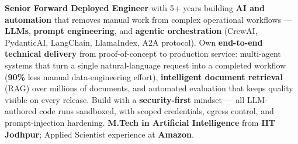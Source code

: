 \documentclass[letter,10pt]{article}
\begin{document}

\textbf{Senior Forward Deployed Engineer} with 5+ years building \textbf{AI and automation} that removes manual work from complex operational workflows --- \textbf{LLMs}, \textbf{prompt engineering}, and \textbf{agentic orchestration} (CrewAI, PydanticAI, LangChain, LlamaIndex, A2A protocol).
Own \textbf{end-to-end technical delivery} from proof-of-concept to production service: multi-agent systems that turn a single natural-language request into a completed workflow (\textbf{90\%} less manual data-engineering effort), \textbf{intelligent document retrieval} (RAG) over millions of documents, and automated evaluation that keeps quality visible on every release.
Build with a \textbf{security-first} mindset --- all LLM-authored code runs sandboxed, with scoped credentials, egress control, and prompt-injection hardening.
\textbf{M.Tech in Artificial Intelligence} from \textbf{IIT Jodhpur}; Applied Scientist experience at \textbf{Amazon}.
\end{document}
